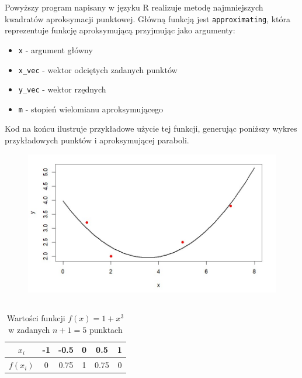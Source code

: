 \documentclass{article}
\begin{document}
\noindent
Powyższy program napisany w języku R realizuje metodę najmniejszych kwadratów aproksymacji punktowej. Główną funkcją jest \verb|approximating|, która reprezentuje funkcję aproksymującą przyjmując jako argumenty:
\begin{itemize}
    \item \verb|x| - argument główny
    \item \verb|x_vec| - wektor odciętych zadanych punktów
    \item \verb|y_vec| - wektor rzędnych
    \item \verb|m| - stopień wielomianu aproksymującego
\end{itemize}
Kod na końcu ilustruje przykładowe użycie tej funkcji, generując poniższy wykres przykładowych punktów i aproksymującej paraboli.

\begin{figure}[h]
    \centering
    \includegraphics[width=\linewidth]{plot.jpg}
\end{figure}

\newpage

\subsection{}
\begin{table}[h]
    \centering
    \begin{tabular}{c|c|c|c|c|c}
        \(x_i\) & -1 & -0.5 & 0 & 0.5 & 1\\
        \hline
        \(f(x_i)\) & 0 & 0.75 & 1 & 0.75 & 0
    \end{tabular}
    \caption{Wartości funkcji \(f(x) = 1 + x^3\) w zadanych \(n+1=5\) punktach}
    \label{tab:table1}
\end{table}
\end{document}
